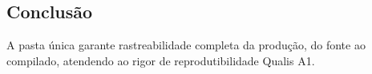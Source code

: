 \hypertarget{conclusuxe3o}{%
\subsection{Conclusão}\label{conclusuxe3o}}

A pasta única garante rastreabilidade completa da produção, do fonte ao
compilado, atendendo ao rigor de reprodutibilidade Qualis A1.
